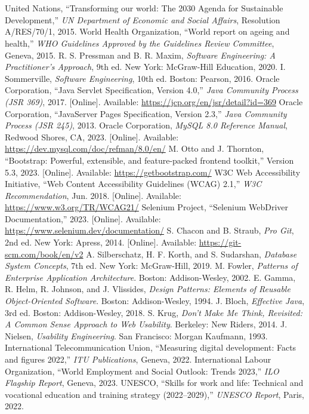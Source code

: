 \documentclass[12pt,a4paper]{report}
\makeatletter
\renewenvironment{thebibliography}[1]
     {\section*{}\@mkboth{}{}%
      \list{\@biblabel{\@arabic\c@enumiv}}%
           {\settowidth\labelwidth{\@biblabel{#1}}%
            \leftmargin\labelwidth
            \advance\leftmargin\labelsep
            \itemsep=0.5\baselineskip
            \usecounter{enumiv}%
            \let\p@enumiv\@empty
            \renewcommand\theenumiv{\@arabic\c@enumiv}}%
      \sloppy}
     {\endlist}
\makeatother
\begin{document}
\begin{thebibliography}{99}
 United Nations, ``Transforming our world: The 2030 Agenda for Sustainable Development,'' \textit{UN Department of Economic and Social Affairs}, Resolution A/RES/70/1, 2015.
 World Health Organization, ``World report on ageing and health,'' \textit{WHO Guidelines Approved by the Guidelines Review Committee}, Geneva, 2015.
 R. S. Pressman and B. R. Maxim, \textit{Software Engineering: A Practitioner's Approach}, 9th ed. New York: McGraw-Hill Education, 2020.
 I. Sommerville, \textit{Software Engineering}, 10th ed. Boston: Pearson, 2016.
 Oracle Corporation, ``Java Servlet Specification, Version 4.0,'' \textit{Java Community Process (JSR 369)}, 2017. [Online]. Available: \url{https://jcp.org/en/jsr/detail?id=369}
 Oracle Corporation, ``JavaServer Pages Specification, Version 2.3,'' \textit{Java Community Process (JSR 245)}, 2013.
 Oracle Corporation, \textit{MySQL 8.0 Reference Manual}, Redwood Shores, CA, 2023. [Online]. Available: \url{https://dev.mysql.com/doc/refman/8.0/en/}
 M. Otto and J. Thornton, ``Bootstrap: Powerful, extensible, and feature-packed frontend toolkit,'' Version 5.3, 2023. [Online]. Available: \url{https://getbootstrap.com/}
 W3C Web Accessibility Initiative, ``Web Content Accessibility Guidelines (WCAG) 2.1,'' \textit{W3C Recommendation}, Jun. 2018. [Online]. Available: \url{https://www.w3.org/TR/WCAG21/}
 Selenium Project, ``Selenium WebDriver Documentation,'' 2023. [Online]. Available: \url{https://www.selenium.dev/documentation/}
 S. Chacon and B. Straub, \textit{Pro Git}, 2nd ed. New York: Apress, 2014. [Online]. Available: \url{https://git-scm.com/book/en/v2}
 A. Silberschatz, H. F. Korth, and S. Sudarshan, \textit{Database System Concepts}, 7th ed. New York: McGraw-Hill, 2019.
 M. Fowler, \textit{Patterns of Enterprise Application Architecture}. Boston: Addison-Wesley, 2002.
 E. Gamma, R. Helm, R. Johnson, and J. Vlissides, \textit{Design Patterns: Elements of Reusable Object-Oriented Software}. Boston: Addison-Wesley, 1994.
 J. Bloch, \textit{Effective Java}, 3rd ed. Boston: Addison-Wesley, 2018.
 S. Krug, \textit{Don't Make Me Think, Revisited: A Common Sense Approach to Web Usability}. Berkeley: New Riders, 2014.
 J. Nielsen, \textit{Usability Engineering}. San Francisco: Morgan Kaufmann, 1993.
 International Telecommunication Union, ``Measuring digital development: Facts and figures 2022,'' \textit{ITU Publications}, Geneva, 2022.
 International Labour Organization, ``World Employment and Social Outlook: Trends 2023,'' \textit{ILO Flagship Report}, Geneva, 2023.
 UNESCO, ``Skills for work and life: Technical and vocational education and training strategy (2022--2029),'' \textit{UNESCO Report}, Paris, 2022.
\end{thebibliography}
\end{document}
